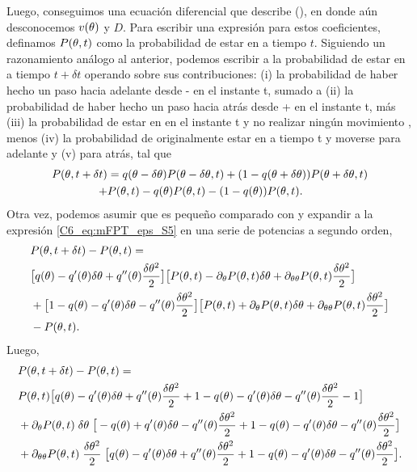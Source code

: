 \documentclass[./main.tex]{subfiles}
\begin{document}
Luego, conseguimos una ecuación diferencial que describe \epsplus(\xx), en donde aún desconocemos $v(\theta)$ y $D$. Para escribir una expresión para estos coeficientes, definamos $P(\theta,t)$ como la probabilidad de estar en \xx a tiempo $t$. Siguiendo un razonamiento análogo al anterior, podemos escribir a la probabilidad de estar en \xx a tiempo $t+\delta t$ operando sobre sus contribuciones: (i) la probabilidad de haber hecho un paso hacia adelante desde \xx - \deltax en el instante t, sumado a (ii) la probabilidad de haber hecho un paso hacia atrás desde \xx + \deltax en el instante t, más (iii) la probabilidad de estar en \xx en el instante t y no realizar ningún movimiento , menos (iv) la probabilidad de originalmente estar en \xx a tiempo t y moverse para adelante y (v) para atrás, tal que 
\begin{align}
    P(\theta,t + \delta t ) &=  q(\theta - \delta\theta) P(\theta-\delta\theta,t) + (1-q(\theta + \delta\theta)) P(\theta+\delta\theta,t) \nonumber \\ +& P(\theta,t) - q(\theta) P(\theta,t) - (1-q(\theta)) P(\theta,t).
    \label{C6_eq:mFPT_eps_S5}
\end{align}
Otra vez, podemos asumir que \deltax es pequeño comparado con \xx y expandir a la expresión \ref{C6_eq:mFPT_eps_S5} en una serie de potencias a segundo orden, 
\begin{align}
    & P( \theta,t + \delta t) - P(\theta,t) = \nonumber \\
    & \big[ q(\theta) - q'(\theta)\delta\theta + q''(\theta) \frac{\delta\theta^2}{2}  \big] \big[ P(\theta,t) - \partial_\theta P(\theta,t) \delta\theta + \partial_{\theta \theta} P(\theta,t) \frac{\delta\theta^2}{2}  \big] \nonumber \\ & + \big[ 1 - q(\theta) - q'(\theta)\delta\theta - q''(\theta) \frac{\delta\theta^2}{2}  \big] \big[ P(\theta,t) + \partial_\theta P(\theta,t) \delta\theta + \partial_{\theta \theta} P(\theta,t) \frac{\delta\theta^2}{2}  \big] \nonumber \\ & - P(\theta,t) .
\end{align}
Luego, 
\begin{align}
    & P( \theta,t + \delta t) - P(\theta,t) = \nonumber \\
    & P(\theta,t) \big[ q(\theta) - q'(\theta)\delta\theta + q''(\theta) \frac{\delta\theta^2}{2} + 1 - q(\theta) - q'(\theta)\delta\theta - q''(\theta) \frac{\delta\theta^2}{2} -1\big] \nonumber \\ & + \partial_\theta P(\theta,t) \; \delta\theta \; \big[ - q(\theta) + q'(\theta)\delta\theta - q''(\theta) \frac{\delta\theta^2}{2} + 1 - q(\theta) - q'(\theta)\delta\theta - q''(\theta) \frac{\delta\theta^2}{2}\big] \nonumber \\ &+ \partial_{\theta \theta} P(\theta,t) \;  \frac{\delta\theta^2}{2} \; \big[  q(\theta) - q'(\theta)\delta\theta + q''(\theta) \frac{\delta\theta^2}{2} +  1 - q(\theta) - q'(\theta)\delta\theta - q''(\theta) \frac{\delta\theta^2}{2} \big] .
\end{align}
\end{document}
